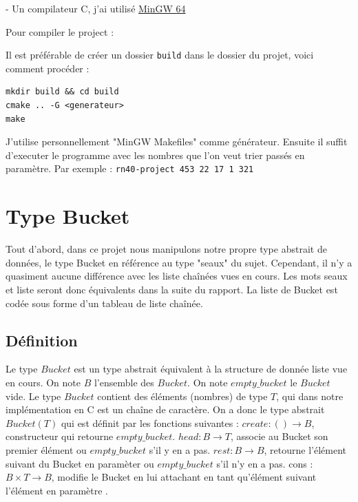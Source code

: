 \documentclass{article}
\begin{document}
- Un compilateur C, j'ai utilisé \href{https://www.mingw-w64.org/}{MinGW 64} 

Pour compiler le project : 

Il est préférable de créer un dossier \lstinline{build} dans le dossier du projet, voici comment procéder :

\begin{lstlisting}
mkdir build && cd build
cmake .. -G <generateur>
make
\end{lstlisting}
J'utilise personnellement "MinGW Makefiles" comme générateur.
Ensuite il suffit d'executer le programme avec les nombres que l'on veut trier passés en paramètre. Par exemple :
\lstinline{rn40-project 453 22 17 1 321}







\newpage

\section{Type Bucket}
Tout d'abord, dans ce projet nous manipulons notre propre type abstrait de données, le type Bucket en référence au type "seaux" du sujet. Cependant, il n'y a quasiment aucune différence avec les liste chaînées vues en cours. Les mots seaux et liste seront donc équivalents dans la suite du rapport. La liste de Bucket est codée sous forme d'un tableau de liste chaînée.
\newline

\subsection{Définition}
Le type $Bucket$ est un type abstrait équivalent à la structure de donnée liste vue en cours. On note $B$ l'ensemble des $Bucket$. On note $empty\_bucket$ le $Bucket$ vide.
\newline
Le type $Bucket$ contient des éléments (nombres) de type $T$, qui dans notre implémentation en C est un chaîne de caractère.
\newline
On a donc le type abstrait $Bucket(T)$ qui est définit par les fonctions suivantes : 
\newline
\newline
$create : () \longrightarrow B$, constructeur qui retourne $empty\_bucket$.
\newline
\newline
$head : B\longrightarrow T$, associe au Bucket son premier élément ou $empty\_bucket$ s'il y en a pas.
\newline
\newline
$rest : B \longrightarrow B$, retourne l'élément suivant du Bucket en paramèter ou $empty\_bucket$ s'il n'y en a pas.
\newline
\newline
cons : $ B \times T \longrightarrow B$, modifie le Bucket en lui attachant en tant qu'élément suivant l'élément en paramètre .
\end{document}
